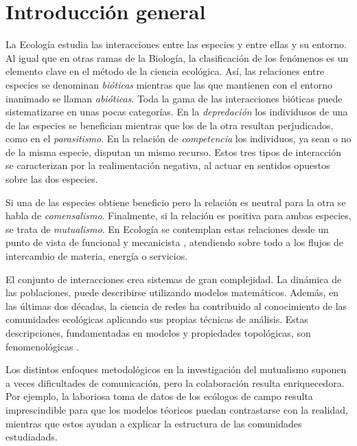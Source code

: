 
\chapter{Introducción general} %

\label{INTROGEN} %


La Ecología estudia las interacciones entre las especies y entre ellas y su entorno. Al igual que en otras ramas de la Biología, la clasificación de los fenómenos es un elemento clave en el método de la ciencia ecológica. Así, las relaciones entre especies se denominan \textit{bióticas} mientras que las que mantienen con el entorno inanimado se llaman \textit{abióticas}. Toda la gama de las interacciones bióticas puede sistematizarse en unas pocas categorías. En la \textit{depredación} los individusos de una de las especies se benefician mientras que los de la otra resultan perjudicados, como en el \textit{parasitismo}. En la relación de \textit{competencia} los individuos, ya sean o no de la misma especie, disputan un mismo recurso. Estos tres tipos de interacción se caracterizan por la realimentación negativa, al actuar en sentidos opuestos sobre las dos especies. 

Si una de las especies obtiene beneficio pero la relación es neutral para la otra se habla de \textit{comensalismo}. Finalmente, si la relación es positiva para ambas especies, se trata de \textit{mutualismo}. En Ecología se contemplan estas relaciones desde un punto de vista de funcional y mecanicista \cite{rockwood2006introduction}, atendiendo sobre todo a los flujos de intercambio de materia, energía o servicios.

El conjunto de interacciones crea sistemas de gran complejidad. La dinámica de las poblaciones, puede describirse utilizando modelos matemáticos. Además, en las últimas dos décadas, la ciencia de redes ha contribuido al conocimiento de las comunidades ecológicas aplicando sus propias técnicas de análisis. Estas descripciones, fundamentadas en modelos y propiedades topológicas, son fenomenológicas \cite{van2010ethical}.

Los distintos enfoques metodológicos en la investigación del mutualismo suponen a veces dificultades de comunicación, pero la colaboración resulta enriquecedora. Por ejemplo, la laboriosa toma de datos de los ecólogos de campo resulta imprescindible para que los modelos téoricos puedan contrastarse con la realidad, mientras que estos ayudan a explicar la estructura de las comunidades estudiadads.

